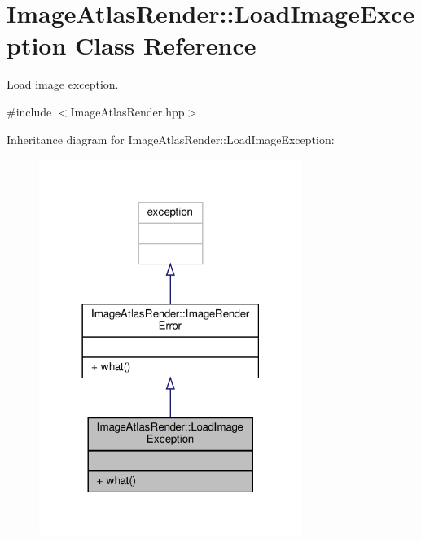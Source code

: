 \hypertarget{class_image_atlas_render_1_1_load_image_exception}{}\section{Image\+Atlas\+Render\+:\+:Load\+Image\+Exception Class Reference}
\label{class_image_atlas_render_1_1_load_image_exception}


Load image exception.  




{\ttfamily \#include $<$Image\+Atlas\+Render.\+hpp$>$}



Inheritance diagram for Image\+Atlas\+Render\+:\+:Load\+Image\+Exception\+:
\nopagebreak
\begin{figure}[H]
\begin{center}
\leavevmode
\includegraphics[width=242pt]{class_image_atlas_render_1_1_load_image_exception__inherit__graph}
\end{center}
\end{figure}


